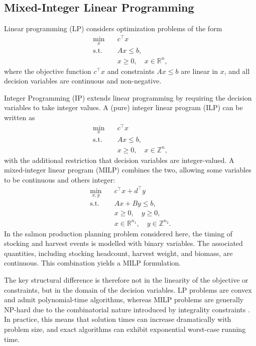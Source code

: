 \documentclass[12pt,a4paper]{article}
\begin{document}
\subsection{Mixed-Integer Linear Programming}
 
Linear programming (LP) considers optimization problems of the form
\begin{align}
\min_{x} \quad & c^\top x \\
\text{s.t.} \quad & Ax \le b, \\
& x \ge 0, \quad x \in \mathbb{R}^n,
\end{align}
where the objective function $c^\top x$ and constraints $Ax \le b$ are linear in $x$, and all decision variables are continuous and non-negative.
 
Integer Programming (IP) extends linear programming by requiring the decision variables to take integer values. A (pure) integer linear program (ILP) can be written as
\begin{align}
\min_{x} \quad & c^\top x \\
\text{s.t.} \quad & Ax \le b, \\
& x \ge 0, \quad x \in \mathbb{Z}^n,
\end{align}
with the additional restriction that decision variables are integer-valued. A mixed-integer linear program (MILP) combines the two, allowing some variables to be continuous and others integer:
\begin{align}
\min_{x,y} \quad & c^\top x + d^\top y \\
\text{s.t.} \quad & Ax + By \le b, \\
& x \ge 0, \quad y \ge 0, \\
& x \in \mathbb{R}^{n_1}, \quad y \in \mathbb{Z}^{n_2}.
\end{align}
In the salmon production planning problem considered here, the timing of stocking and harvest events is modelled with binary variables. The associated quantities, including stocking headcount, harvest weight, and biomass, are continuous. This combination yields a MILP formulation.
 
The key structural difference is therefore not in the linearity of the objective or constraints, but in the domain of the decision variables. LP problems are convex and admit polynomial-time algorithms, whereas MILP problems are generally NP-hard due to the combinatorial nature introduced by integrality constraints \citep{nemhauser1988integer}. In practice, this means that solution times can increase dramatically with problem size, and exact algorithms can exhibit exponential worst-case running time.
 
\end{document}
